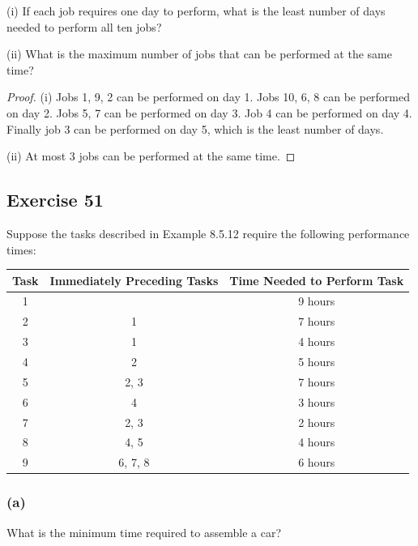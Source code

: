 \documentclass[14pt]{extarticle}
\newcommand{\cy}{\color{cyan}}
\begin{document}
(i) If each job requires one day to perform, what is the least number of days needed to perform all ten jobs?

(ii) What is the maximum number of jobs that can be performed at the same time?

\begin{proof}
(i) Jobs 1, 9, 2 can be performed on day 1. Jobs 10, 6, 8 can be performed on day 2. Jobs 5, 7 can be performed on 
day 3. Job 4 can be performed on day 4. Finally job 3 can be performed on day 5, which is the least number of days.

(ii) At most 3 jobs can be performed at the same time.
\end{proof}

\subsection{Exercise 51}
Suppose the tasks described in Example 8.5.12 require the following performance times:

\begin{center}
\begin{tabular}{|c|c|c|}
\hline
{\bf \cy Task} & {\bf \cy Immediately Preceding Tasks} & {\bf \cy Time Needed to Perform Task} \\
\hline
1 &  & 9 hours \\
\hline
2 & 1 & 7 hours \\
\hline
3 & 1 & 4 hours \\
\hline
4 & 2 & 5 hours \\
\hline
5 & 2, 3 & 7 hours \\
\hline
6 & 4 & 3 hours \\
\hline
7 & 2, 3 & 2 hours \\
\hline
8 & 4, 5 & 4 hours \\
\hline
9 & 6, 7, 8 & 6 hours \\
\hline
\end{tabular}
\end{center}

\subsubsection{(a)}
What is the minimum time required to assemble a car?
\end{document}
